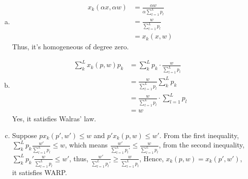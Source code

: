 \documentclass[11pt]{article} %
\begin{document}
\begin{enumerate}[(a)]
    \item \begin{align*}
        x_k(\alpha x, \alpha w)&=\frac{\alpha w}{\alpha \sum_{l=1}^L p_l}\\
                                &=\frac{w}{\sum_{l=1}^L p_l}\\
                                &=x_k(x,w)
    \end{align*}
    Thus, it's homogeneous of degree zero.
    \item \begin{align*}
        \sum_k^Lx_k(p,w)p_k&=\sum_k^Lp_k\cdot \frac{w}{\sum_{l=1}^L p_l}\\
                            &= \frac{w}{\sum_{l=1}^L p_l}\sum_k^Lp_k\\
                            &=\frac{w}{\sum_{l=1}^L p_l}\cdot \sum_{l=1}^L p_l\\
                            &=w
    \end{align*}
    Yes, it satisfies Walras' law.
    \item Suppose $px_k(p',w')\leq w$ and $p'x_k(p,w)\leq w'$. From the first inequality, $\sum_k^L p_k \frac{w'}{\sum_{l=1}^L p_l}\leq w$, which means $\frac{w'}{\sum_{l=1}^L p_l'}\leq \frac{w}{\sum_{l=1}^L p_l}$,
    from the second inequality, $\sum_k^Lp_k'\frac{w}{\sum_{l=1}^L p_l}\leq w'$, thus, $\frac{w'}{\sum_{l=1}^L p_l'}\geq \frac{w}{\sum_{l=1}^L p_l}$,
    Hence, $x_k(p,w)=x_k(p',w')$, it satisfies WARP.  
\end{enumerate}
\end{document}
